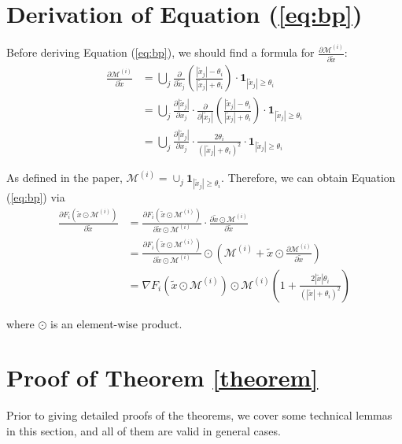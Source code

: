 \documentclass{article}
\theoremstyle{plain}
\theoremstyle{definition}
\theoremstyle{remark}
\renewcommand{\eqref}[1]{Equation (\ref{#1})}
\begin{document}
\newpage
\section{Derivation of \eqref{eq:bp}} \label{apdx:derivation}

Before deriving \eqref{eq:bp}, we should find a formula for $\frac{\partial\mathcal{M}^{(i)}}{\partial\tilde{x}}$:
\begin{align}
\frac{\partial\mathcal{M}^{(i)}}{\partial\tilde{x}}&=\bigcup_j \frac{\partial}{\partial\tilde{x}_j} \left(\frac{|\tilde{x}_{j}| - \theta_i}{|\tilde{x}_{j}| + \theta_i}\right)\cdot\boldsymbol{1}_{|\tilde{x}_{j}|\geq\theta_i}\\
&=\bigcup_j \frac{\partial|\tilde{x}_j|}{\partial x_j} \cdot \frac{\partial}{\partial|\tilde{x}_j|} \left(\frac{|\tilde{x}_{j}| - \theta_i}{|\tilde{x}_{j}| + \theta_i}\right)\cdot\boldsymbol{1}_{|\tilde{x}_{j}|\geq\theta_i}\\
&=\bigcup_j \frac{\partial|\tilde{x}_j|}{\partial x_j} \cdot \frac{2\theta_i}{(|\tilde{x}_{j}| + \theta_i)^2}\cdot\boldsymbol{1}_{|\tilde{x}_{j}|\geq\theta_i}
\end{align}

As defined in the paper, $\mathcal{M}^{(i)}=\cup_j \boldsymbol{1}_{|\tilde{x}_{j}|\geq\theta_i}$. Therefore, we can obtain \eqref{eq:bp} via
\begin{align}
\frac{\partial F_i(\tilde{x} \odot \mathcal{M}^{(i)})}{\partial\tilde{x}}&=\frac{\partial F_i(\tilde{x} \odot \mathcal{M}^{(i)})}{\partial\tilde{x} \odot \mathcal{M}^{(i)}} \cdot \frac{\partial \tilde{x} \odot \mathcal{M}^{(i)}}{\partial\tilde{x}}\\
&=\frac{\partial F_i(\tilde{x} \odot \mathcal{M}^{(i)})}{\partial\tilde{x} \odot \mathcal{M}^{(i)}}\odot\left(\mathcal{M}^{(i)} + \tilde{x}\odot\frac{\partial\mathcal{M}^{(i)}}{\partial\tilde{x}}\right)\\
&=\nabla F_i(\tilde{x} \odot \mathcal{M}^{(i)})\odot \mathcal{M}^{(i)}\left(1+\frac{2|\tilde{x}|\theta_i}{(|\tilde{x}| + \theta_i)^2}\right)
\end{align}

where $\odot$ is an element-wise product.

\section{Proof of Theorem \ref{theorem}} \label{appendix:proof}

Prior to giving detailed proofs of the theorems, we cover some technical lemmas in this section, and all of them are valid in general cases.
\end{document}
